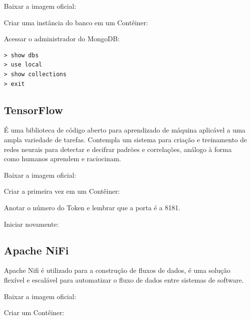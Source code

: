 \documentclass[a4paper,11pt]{article}
\begin{document}
Baixar a imagem oficial: \\

Criar uma instância do banco em um Contêiner: \\

Acessar o administrador do MongoDB: \\
\begin{lstlisting}
> show dbs
> use local
> show collections
> exit
\end{lstlisting}

\subsection{TensorFlow}
É uma biblioteca de código aberto para aprendizado de máquina aplicável a uma ampla variedade de tarefas. Contempla um sistema para criação e treinamento de redes neurais para detectar e decifrar padrões e correlações, análogo à forma como humanos aprendem e raciocinam. 

Baixar a imagem oficial: \\

Criar a primeira vez em um Contêiner: \\

Anotar o número do Token e lembrar que a porta é a 8181. 

Iniciar novamente: \\

\subsection{Apache NiFi}
Apache Nifi é utilizado para a construção de fluxos de dados, é uma solução flexível e escalável para automatizar o fluxo de dados entre sistemas de software. 

Baixar a imagem oficial: \\

Criar um Contêiner: \\
\end{document}
